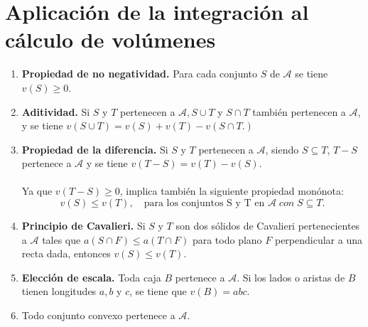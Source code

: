 \begin{enumerate}[ \bfseries 1.]
\end{enumerate}

\section{Aplicación de la integración al cálculo de volúmenes}
    \begin{enumerate}[\bfseries 1.]

	\item \textbf{Propiedad de no negatividad.} Para cada conjunto $S$ de $\mathscr{A}$ se tiene $v(S)\geq 0$.

	\item \textbf{Aditividad.} Si $S$ y $T$ pertenecen a $\mathscr{A}, S\cup T$ y  $S\cap T$ también pertenecen a $\mathscr{A}$, y se tiene $v(S\cup T) = v(S) + v(T) - v(S\cap T.)$

	\item \textbf{Propiedad de la diferencia.} Si $S$ y $T$ pertenecen a  $\mathscr{A}$, siendo $S\subseteq T$, $T-S$ pertenece a $\mathscr{A}$ y se tiene $v(T-S)=v(T)-v(S)$.\\\\
	    Ya que $v(T-S)\geq 0$, implica también la siguiente propiedad monónota:
	    $$v(S)\leq v(T), \quad \mbox{para los conjuntos S y T en } \mathscr{A} \; con \; S\subseteq T.$$

	\item \textbf{Principio de Cavalieri.}  Si $S$ y $T$ son dos sólidos de Cavalieri pertenecientes a $\mathscr{A}$ tales que $a(S\cap F)\leq a(T\cap F)$ para todo plano $F$ perpendicular a una recta dada, entonces $v(S)\leq v(T)$.

	\item \textbf{Elección de escala.} Toda caja $B$ pertenece a $\mathscr{A}$. Si los lados o aristas de $B$ tienen longitudes $a,b$ y $c$, se tiene que $v(B)=abc$.

	\item Todo conjunto convexo pertenece a $\mathscr{A}$. 

    \end{enumerate}

